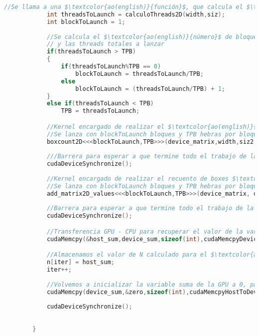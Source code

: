 \begin{lstlisting}[language=C++,caption={Primera versión del Boxcount2D paralelizado con CUDA},label=CUDABox2D,basicstyle=\tiny]
            //Se llama a una $\textcolor{ao(english)}{función}$, que calcula el $\textcolor{ao(english)}{número}$ de hebras a lanzar para cada $\textcolor{ao(english)}{tamaño}$ de siz 
            int threadsToLaunch = calculoThreads2D(width,siz);
            int blockToLaunch = 1;
    
            //Se calcula el $\textcolor{ao(english)}{número}$ de bloques a lanzar en $\textcolor{ao(english)}{función}$ de las threads por bloque 
            // y las threads totales a lanzar 
            if(threadsToLaunch > TPB)
            {
                if(threadsToLaunch%TPB == 0)
                    blockToLaunch = threadsToLaunch/TPB;
                else
                    blockToLaunch = (threadsToLaunch/TPB) + 1;
            }
            else if(threadsToLaunch < TPB)
                TPB = threadsToLaunch;

            //Kernel encargado de realizar el $\textcolor{ao(english)}{cálculo}$ de los boxes.
            //Se lanza con blockToLaunch bloques y TPB hebras por bloque 
            boxcount2D<<<blockToLaunch,TPB>>>(device_matrix,width,siz2,siz,threadsToLaunch);
    
            ///Barrera para esperar a que termine todo el trabajo de la GPU
            cudaDeviceSynchronize();
    
            //Kernel encargado de realizar el recuento de boxes $\textcolor{ao(english)}{válidos}$
            //Se lanza con blockToLaunch bloques y TPB hebras por bloque 
            add_matrix2D_values<<<blockToLaunch,TPB>>>(device_matrix, device_sum,width,siz,threadsToLaunch);
            
            //Barrera para esperar a que termine todo el trabajo de la GPU
            cudaDeviceSynchronize();

            //Transferencia GPU - CPU para recuperar el valor de la variable suma calculado
            cudaMemcpy(&host_sum,device_sum,sizeof(int),cudaMemcpyDeviceToHost);

            //Almacenamos el valor de N calculado para el $\textcolor{ao(english)}{tamaño}$ r
            n[iter] = host_sum;
            iter++;
    
            //Volvemos a inicializar la variable suma de la GPU a 0, para la siguiente $\textcolor{ao(english)}{iteración}$
            cudaMemcpy(device_sum,&zero,sizeof(int),cudaMemcpyHostToDevice);
    
            cudaDeviceSynchronize();
    
    
        }
    

\end{lstlisting}
